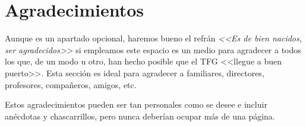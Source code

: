 \chapter*{Agradecimientos} %

 Aunque es un apartado opcional, haremos bueno el refrán \emph{<<Es de bien nacidos, ser agradecidos>>} si empleamos este espacio es un medio para agradecer a todos los que, de un modo u otro, han hecho posible que el TFG <<llegue a buen puerto>>. Esta sección es ideal para agradecer a familiares, directores, profesores, compañeros, amigos, etc. 
 
 Estos agradecimientos pueden ser tan personales como se desee e incluir anécdotas y chascarrillos, pero nunca deberían ocupar más de una página.

\makeatletter		
\begin{flushright}
	\textit{\@autor}
\end{flushright}
\makeatother